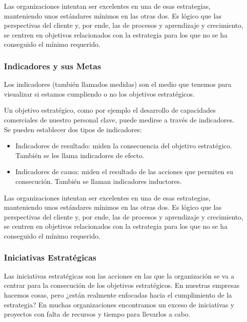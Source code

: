 \documentclass[preprint,12pt]{elsarticle}
\begin{document}
Las organizaciones intentan ser excelentes en una de esas estrategias, manteniendo unos estándares mínimos en las otras dos. Es lógico que las perspectivas del cliente y, por ende, las  de procesos y aprendizaje y crecimiento, se centren en objetivos relacionados con la estrategia para los que no se ha conseguido el mínimo requerido.\cite{referenciarobles1} 

\subsubsection{\textbf{Indicadores y sus Metas}}

Los indicadores (también llamados medidas) son el medio que tenemos para visualizar si estamos cumpliendo o no los objetivos estratégicos.

Un objetivo estratégico, como por ejemplo el desarrollo de capacidades comerciales de nuestro personal clave, puede medirse a través de indicadores.
\\

Se pueden establecer dos tipos de indicadores:

	\begin{itemize}
	\item Indicadores de resultado: miden la consecuencia del objetivo estratégico. También se les llama indicadores de efecto.
	\item Indicadores de causa: miden el resultado de las acciones que permiten su consecución. También se llaman indicadores inductores.
	\end{itemize}

Las organizaciones intentan ser excelentes en una de esas estrategias, manteniendo unos estándares mínimos en las otras dos. Es lógico que las perspectivas del cliente y, por ende, las  de procesos y aprendizaje y crecimiento, se centren en objetivos relacionados con la estrategia para los que no se ha conseguido el mínimo requerido.\cite{referenciarobles2} 

\subsubsection{\textbf{Iniciativas Estratégicas}}

Las iniciativas estratégicas son las acciones en las que la organización se va a centrar para la consecución de los objetivos estratégicos. En nuestras empresas hacemos cosas, pero ¿están realmente enfocadas hacia el cumplimiento de la estrategia? En muchas organizaciones encontramos un exceso de iniciativas y proyectos con falta de recursos y tiempo para llevarlos a cabo.
\\
\end{document}
